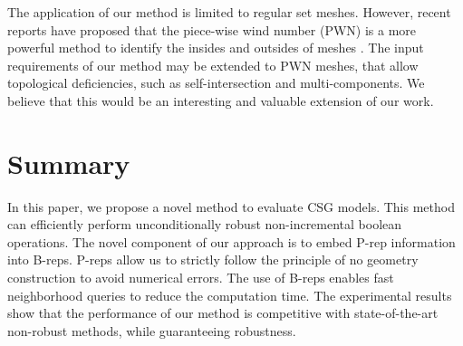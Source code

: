 The application of our method is limited to regular set meshes. However, recent reports have proposed that the piece-wise wind number (PWN) is a more powerful method to identify the insides and outsides of meshes \cite{zhou2016mesh}. The input requirements of our method may be extended to PWN meshes, that allow topological deficiencies, such as self-intersection and multi-components. We believe that this would be an interesting and valuable extension of our work.



\section{Summary}


In this paper, we propose a novel method to evaluate CSG models. This method can efficiently perform unconditionally robust non-incremental boolean operations. The novel component of our approach is to embed P-rep information into B-reps. P-reps allow us to strictly follow the principle of no geometry construction to avoid numerical errors. The use of B-reps enables fast neighborhood queries to reduce the computation time. The experimental results show that the performance of our method is competitive with state-of-the-art non-robust methods, while guaranteeing robustness.
